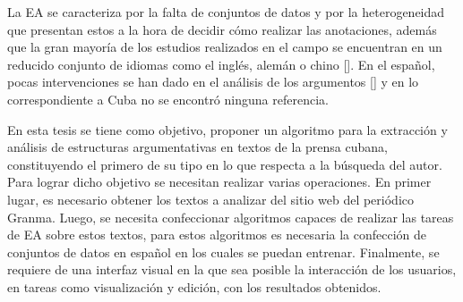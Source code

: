 \documentclass[a4paper,11pt,twocolumn,twoside]{article}
\begin{document}
La EA se caracteriza por la falta de conjuntos de datos y 
por la heterogeneidad que presentan estos a la hora de decidir cómo realizar las 
anotaciones, además que la gran mayoría de los estudios realizados en el campo se encuentran en 
un reducido conjunto de idiomas como el inglés, alemán o chino [\cite{eger2018cross}]. 
En el español, pocas intervenciones se han dado en el análisis de los argumentos [\cite{esteve2020mineria}] y en 
lo correspondiente a Cuba no se encontró ninguna referencia. 


En esta tesis se tiene como objetivo, proponer un algoritmo para 
la extracción y análisis de estructuras argumentativas en textos 
de la prensa cubana, constituyendo el primero de su tipo en lo que respecta a la búsqueda del autor. 
Para lograr dicho objetivo se necesitan realizar varias operaciones.
En primer lugar, es necesario obtener los textos a analizar del sitio 
web del periódico Granma. Luego, se necesita confeccionar algoritmos capaces de realizar las tareas 
de EA sobre estos textos, para estos algoritmos es necesaria la confección de conjuntos 
de datos en español en los cuales se puedan entrenar. Finalmente, se requiere de una interfaz visual 
en la que sea posible la interacción de los usuarios, en tareas como visualización y edición, 
con los resultados obtenidos. 
\end{document}

